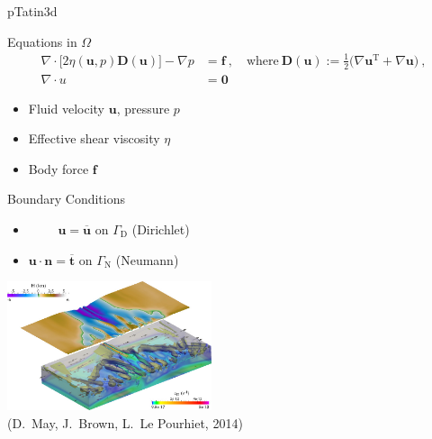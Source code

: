 \begin{frame}{pTatin3d}

  \begin{block}{Equations in $\Omega$}
        \begin{align*}
          \nabla \cdot \bigl[ 2 \eta(\mathbf u, p) \mathbf D(\mathbf u) \bigr] - \nabla p &= \mathbf f \ , \quad \mathrm{where} \ 
          \mathbf D(\mathbf u) := \frac{1}{2}\bigl(\nabla \mathbf u^{\mathrm T} + \nabla \mathbf u \bigr) \ , \\
          \nabla \cdot u &= \mathbf 0
         \end{align*}
  \begin{itemize}
   \item Fluid velocity $\mathbf u$, pressure $p$
   \item Effective shear viscosity $\eta$
   \item Body force $\mathbf f$
  \end{itemize}
  \end{block}

  \begin{block}{Boundary Conditions}
  \begin{itemize}
   \item \ \ \ \ $\, \, \! \mathbf u = \mathbf{\overline{u}}$ on $\Gamma_{\mathrm D}$ (Dirichlet)
   \item $\mathbf u \cdot \mathbf n = \mathbf{\overline{t}}$ on $\Gamma_{\mathrm N}$ (Neumann)
  \end{itemize}
  \end{block}

  \begin{flushright}
   \vspace*{-4cm} \includegraphics[width=0.45\textwidth]{figures/rifting} \\
   {\scriptsize (D.~May, J.~Brown, L.~Le Pourhiet, 2014)}
  \end{flushright}

\end{frame}


